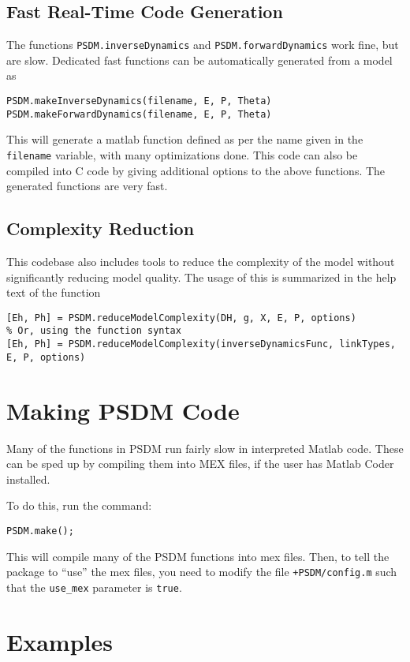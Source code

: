 \documentclass[12pt]{article}
\begin{document}
\subsection{Fast Real-Time Code Generation}
The functions \texttt{PSDM.inverseDynamics} and \texttt{PSDM.forwardDynamics} work fine, but are slow. Dedicated fast functions can be automatically generated from a model as
\begin{lstlisting}
PSDM.makeInverseDynamics(filename, E, P, Theta)
PSDM.makeForwardDynamics(filename, E, P, Theta)
\end{lstlisting}\vspace{1em}
This will generate a matlab function defined as per the name given in the \texttt{filename} variable, with many optimizations done. This code can also be compiled into C code by giving additional options to the above functions. The generated functions are very fast.

\subsection{Complexity Reduction}
This codebase also includes tools to reduce the complexity of the model without significantly reducing model quality. The usage of this is summarized in the help text of the function
\begin{lstlisting}
[Eh, Ph] = PSDM.reduceModelComplexity(DH, g, X, E, P, options)
% Or, using the function syntax
[Eh, Ph] = PSDM.reduceModelComplexity(inverseDynamicsFunc, linkTypes, E, P, options)
\end{lstlisting}

\section{Making PSDM Code}

Many of the functions in PSDM run fairly slow in interpreted Matlab code. These can be sped up by compiling them into MEX files, if the user has Matlab Coder installed.

To do this, run the command:
\begin{lstlisting}
PSDM.make();
\end{lstlisting}

This will compile many of the PSDM functions into mex files. Then, to tell the package to ``use'' the mex files, you need to modify the file \texttt{+PSDM/config.m} such that the \texttt{use\_mex} parameter is \texttt{true}.

\section{Examples}
\end{document}
